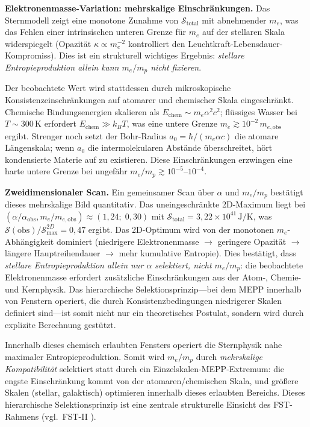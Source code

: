 \documentclass[12pt,a4paper]{article}
\theoremstyle{remark}
\begin{document}
\textbf{Elektronenmasse-Variation: mehrskalige Einschr\"ankungen.} Das Sternmodell zeigt eine monotone Zunahme von $\mathcal{S}_{\text{total}}$ mit abnehmender $m_e$, was das Fehlen einer intrinsischen unteren Grenze f\"ur $m_e$ auf der stellaren Skala widerspiegelt (Opazit\"at $\kappa \propto m_e^{-2}$ kontrolliert den Leuchtkraft-Lebensdauer-Kompromiss). Dies ist ein strukturell wichtiges Ergebnis: \emph{stellare Entropieproduktion allein kann $m_e/m_p$ nicht fixieren}.

Der beobachtete Wert wird stattdessen durch mikroskopische Konsistenzeinschr\"ankungen auf atomarer und chemischer Skala eingeschr\"ankt. Chemische Bindungsenergien skalieren als $E_{\text{chem}} \sim m_e \alpha^2 c^2$; fl\"ussiges Wasser bei $T \sim 300\,$K erfordert $E_{\text{chem}} \gg k_B T$, was eine untere Grenze $m_e \gtrsim 10^{-2}\,m_{e,\text{obs}}$ ergibt. Strenger noch setzt der Bohr-Radius $a_0 = \hbar/(m_e \alpha c)$ die atomare L\"angenskala; wenn $a_0$ die intermolekularen Abst\"ande \"uberschreitet, h\"ort kondensierte Materie auf zu existieren. Diese Einschr\"ankungen erzwingen eine harte untere Grenze bei ungef\"ahr $m_e/m_p \gtrsim 10^{-5}$--$10^{-4}$.

\textbf{Zweidimensionaler Scan.} Ein gemeinsamer Scan \"uber $\alpha$ und $m_e/m_p$ best\"atigt dieses mehrskalige Bild quantitativ. Das uneingeschr\"ankte 2D-Maximum liegt bei $(\alpha/\alpha_{\text{obs}}, m_e/m_{e,\text{obs}}) \approx (1{,}24;\; 0{,}30)$ mit $\mathcal{S}_{\text{total}} = 3{,}22 \times 10^{41}\,\text{J/K}$, was $\mathcal{S}(\text{obs})/\mathcal{S}_{\text{max}}^{2D} = 0{,}47$ ergibt. Das 2D-Optimum wird von der monotonen $m_e$-Abh\"angigkeit dominiert (niedrigere Elektronenmasse $\to$ geringere Opazit\"at $\to$ l\"angere Hauptreihendauer $\to$ mehr kumulative Entropie). Dies best\"atigt, dass \emph{stellare Entropieproduktion allein nur $\alpha$ selektiert, nicht $m_e/m_p$}: die beobachtete Elektronenmasse erfordert zus\"atzliche Einschr\"ankungen aus der Atom-, Chemie- und Kernphysik. Das hierarchische Selektionsprinzip---bei dem MEPP innerhalb von Fenstern operiert, die durch Konsistenzbedingungen niedrigerer Skalen definiert sind---ist somit nicht nur ein theoretisches Postulat, sondern wird durch explizite Berechnung gest\"utzt.

Innerhalb dieses chemisch erlaubten Fensters operiert die Sternphysik nahe maximaler Entropieproduktion. Somit wird $m_e/m_p$ durch \emph{mehrskalige Kompatibilit\"at} selektiert statt durch ein Einzelskalen-MEPP-Extremum: die engste Einschr\"ankung kommt von der atomaren/chemischen Skala, und gr\"o\ss{}ere Skalen (stellar, galaktisch) optimieren innerhalb dieses erlaubten Bereichs. Dieses hierarchische Selektionsprinzip ist eine zentrale strukturelle Einsicht des FST-Rahmens (vgl.\ FST-II \citep{FSTII}).
\end{document}

